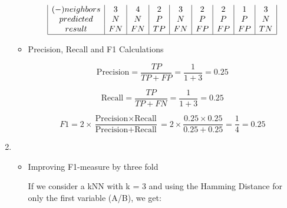 \documentclass[12pt]{article}
\begin{document}
\begin{enumerate}[leftmargin=\labelsep, label=\textbf{\arabic*.)}]
\begin{itemize}
\begin{minipage}{1\textwidth}
\[\begin{array}{|c|c|c|c|c|c|c|c|c|}
                                (-) neighbors & 3   & 4   & 2   & 3   & 2   & 2   & 1   & 3   \\
                                predicted     & N   & N   & P   & N   & P   & P   & P   & N   \\
                                result        & FN  & FN  & TP  & FN  & FP  & FP  & FP  & TN  \\
                                \hline
                            \end{array}
                        \]
                    \end{minipage}
                    \vspace{0.5em}
              \item Precision, Recall and F1 Calculations

                    \[
                        \text{Precision} = \frac{TP}{TP + FP} = \frac{1}{1 + 3} = 0.25
                    \]

                    \[
                        \text{Recall} = \frac{TP}{TP + FN} = \frac{1}{1 + 3} = 0.25
                    \]

                    \[
                        F1 = 2 \times \frac{\text{Precision} \times \text{Recall}}{\text{Precision} + \text{Recall}} = 2 \times \frac{0.25 \times 0.25}{0.25 + 0.25} = \frac{1}{4} = 0.25
                    \]

          \end{itemize}
          \vspace{0.5em}
    \item \begin{itemize}
              \item Improving F1-measure by three fold
                    \vspace{0.5em}

                    If we consider a kNN with k = 3 and using the Hamming Distance for only the first variable (A/B), we get:

                    \vspace{0.5em}


\end{itemize}
\end{enumerate}
\end{document}
